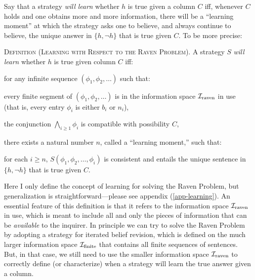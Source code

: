 Say that a strategy {\em will learn} whether $h$ is true given a column $C$ iff, whenever $C$ holds and one obtains more and more information, there will be a ``learning moment'' at which the strategy asks one to believe, and always continue to believe, the unique answer in $\{h, \neg h\}$ that is true given $C$. To be more precise: \op

	\xm \textsc{Definition (Learning with Respect to the Raven Problem).} A strategy $S$ {\em will learn} whether $h$ is true given column $C$ iff: \op

		\xm for any infinite sequence $(\phi_1, \phi_2, \ldots)$ such that: \op

			\im every finite segment of $(\phi_1, \phi_2, \ldots)$ is in the information space ${\cal I}_\text{raven}$ in use (that  is, every entry $\phi_i$ is either $b_i$ or $n_i$),

			\im the conjunction $\bigwedge_{i \ge 1} \phi_i$ is compatible with possibility $C$,

		\ed there exists a natural number $n$, called a ``learning moment,'' such that: \op

			\im  for each $i\ge n$, $S(\phi_1, \phi_2, \ldots, \phi_i)$ is consistent and entails the unique sentence in $\{h, \neg h\}$ that is true given $C$.
		\ed\ed

\ed Here I only define the concept of learning for solving the Raven Problem, but generalization is straightforward---please see appendix (\autoref{app-learning}). An essential feature of this definition is that it refers to the information space ${\cal I}_\text{raven}$ in use, which is meant to include all and only the pieces of information that can be {\em available} to the inquirer. In principle we can try to solve the Raven Problem by adopting a strategy for iterated belief revision, which is defined on the much larger information space ${\cal I}_\text{finite}$ that contains all finite sequences of sentences. But, in that case, we still need to use the smaller information space ${\cal I}_\text{raven}$ to correctly define (or characterize) when a strategy will learn the true answer given a column.

